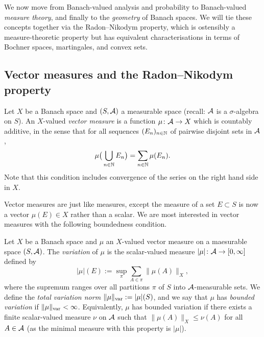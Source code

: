We now move from Banach-valued analysis and probability to Banach-valued \emph{measure theory}, and finally to the \emph{geometry} of Banach spaces.
We will tie these concepts together via the Radon--Nikodym property, which is ostensibly a measure-theoretic property but has equivalent characterisations in terms of Bochner spaces, martingales, and convex sets.

\subsection{Vector measures and the Radon--Nikodym property}

\begin{defn}
  Let $X$ be a Banach space and $(S,\mathcal{A})$ a measurable space (recall: $\mathcal{A}$ is a $\sigma$-algebra on $S$).
  An $X$-valued \emph{vector measure} is a function $\mu \colon \mathcal{A} \rightarrow X$ which is countably additive, in the sense that for all sequences $(E_n)_{n \in \mathbb{N}}$ of pairwise disjoint sets in $\mathcal{A}$,
  \begin{equation*}
    \mu\big( \bigcup_{n \in \mathbb{N}} E_n \big) = \sum_{n \in \mathbb{N}} \mu(E_n).
  \end{equation*}
  Note that this condition includes convergence of the series on the right hand side in $X$.
\end{defn}

Vector measures are just like measures, except the measure of a set $E \subset S$ is now a vector $\mu(E) \in X$ rather than a scalar.
We are most interested in vector measures with the following boundedness condition.

\begin{defn}
  Let $X$ be a Banach space and $\mu$ an $X$-valued vector measure on a maesurable space $(S,\mathcal{A})$.
  The \emph{variation} of $\mu$ is the scalar-valued measure $|\mu| \colon \mathcal{A} \rightarrow [0,\infty]$ defined by
  \begin{equation*}
    |\mu|(E) := \sup_{\pi} \sum_{A \in \pi} \|\mu(A)\|_X,
  \end{equation*}
  where the supremum ranges over all partitions $\pi$ of $S$ into $\mathcal{A}$-measurable sets.
  We define the \emph{total variation norm} $\|\mu\|_{\mathrm{var}} := |\mu|(S)$, and we say that $\mu$ has \emph{bounded variation} if $\|\mu\|_{\mathrm{var}} < \infty$.
  Equivalently, $\mu$ has bounded variation if there exists a finite scalar-valued measure $\nu$ on $\mathcal{A}$ such that $\|\mu(A)\|_X \leq \nu(A)$ for all $A \in \mathcal{A}$ (as the minimal measure with this property is $|\mu|$).
\end{defn}

